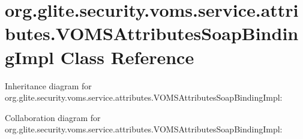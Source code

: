 \hypertarget{classorg_1_1glite_1_1security_1_1voms_1_1service_1_1attributes_1_1VOMSAttributesSoapBindingImpl}{
\section{org.glite.security.voms.service.attributes.VOMSAttributesSoapBindingImpl Class Reference}
\label{classorg_1_1glite_1_1security_1_1voms_1_1service_1_1attributes_1_1VOMSAttributesSoapBindingImpl}
}


Inheritance diagram for org.glite.security.voms.service.attributes.VOMSAttributesSoapBindingImpl:


Collaboration diagram for org.glite.security.voms.service.attributes.VOMSAttributesSoapBindingImpl:
